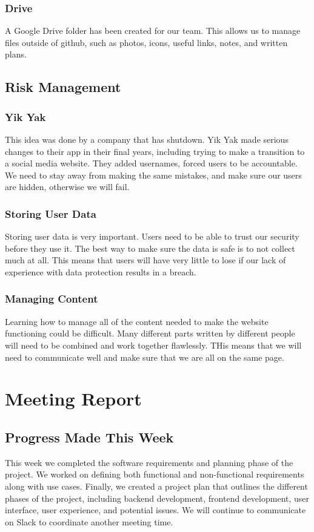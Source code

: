 \documentclass[12pt]{article}
\begin{document}
\subsubsection{Drive}
	A Google Drive folder has been created for our team. This allows us to manage files outside of github, such as photos, icons, useful links, notes, and written plans.

\subsection{Risk Management}
\subsubsection{Yik Yak}
	This idea was done by a company that has shutdown. Yik Yak made serious changes to their app in their final years, including trying to make a transition to a social media website. They added usernames, forced users to be accountable. We need to stay away from making the same mistakes, and make sure our users are hidden, otherwise we will fail.
\subsubsection{Storing User Data}
	Storing user data is very important. Users need to be able to trust our security before they use it. The best way to make sure the data is safe is to not collect much at all. This means that users will have very little to lose if our lack of experience with data protection results in a breach.
\subsubsection{Managing Content}
	Learning how to manage all of the content needed to make the website functioning could be difficult. Many different parts written by different people will need to be combined and work together flawlessly. THis means that we will need to communicate well and make sure that we are all on the same page.


\section{Meeting Report}

\subsection{Progress Made This Week}
	This week we completed the software requirements and planning phase of the project.  We worked on defining both functional and non-functional requirements along with use cases.  Finally, we created a project plan that outlines the different phases of the project, including backend development, frontend development, user interface, user experience, and potential issues.  We will continue to communicate on Slack to coordinate another meeting time.
\end{document}
